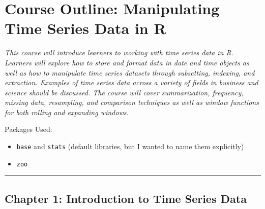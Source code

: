 \documentclass[
]{book}
\providecommand{\tightlist}{%
  \setlength{\itemsep}{0pt}\setlength{\parskip}{0pt}}
\begin{document}
\hypertarget{course-outline-manipulating-time-series-data-in-r}{%
\chapter{Course Outline: Manipulating Time Series Data in R}\label{course-outline-manipulating-time-series-data-in-r}}

\emph{This course will introduce learners to working with time series data in R. Learners will explore how to store and format data in date and time objects as well as how to manipulate time series datasets through subsetting, indexing, and extraction. Examples of time series data across a variety of fields in business and science should be discussed. The course will cover summarization, frequency, missing data, resampling, and comparison techniques as well as window functions for both rolling and expanding windows.}

Packages Used:

\begin{itemize}
\tightlist
\item
  \texttt{base} and \texttt{stats} (default libraries, but I wanted to name them explicitly)
\item
  \texttt{zoo}
\end{itemize}

\begin{center}\rule{0.5\linewidth}{0.5pt}\end{center}

\hypertarget{chapter-1-introduction-to-time-series-data}{%
\section{Chapter 1: Introduction to Time Series Data}\label{chapter-1-introduction-to-time-series-data}}
\end{document}
